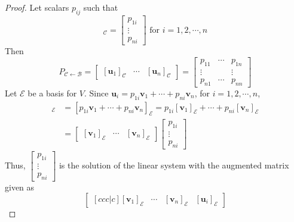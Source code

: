 \begin{proof}
	Let scalars $p_{ij}$ such that \begin{equation*}
		[\textbf{u}_i]_\mathcal{C} = \begin{bmatrix}
			p_{1i} \\ \vdots \\ p_{ni}
		\end{bmatrix} \mbox{ for } i = 1, 2, \cdots, n
	\end{equation*} Then \begin{equation*}
		P_{ \mathcal{C} \leftarrow \mathcal{B} } = \begin{bmatrix}
			\left [\textbf{u}_1\right ]_\mathcal{C} & \cdots & [\textbf{u}_n]_\mathcal{C}
		\end{bmatrix} = \begin{bmatrix}
			p_{11} & \cdots & p_{1n} \\
			\vdots & & \vdots \\
			p_{n1} & \cdots & p_{nn}
		\end{bmatrix}
	\end{equation*}
	Let $\mathcal{E}$ be a basis for $V$. Since $\textbf{u}_i = p_{1i}\textbf{v}_1 + \cdots + p_{ni}\textbf{v}_n$, for $i = 1, 2, \cdots, n$, \begin{align*}
		[\textbf{u}_i]_\mathcal{E} &= [p_{1i}\textbf{v}_1 + \cdots + p_{ni}\textbf{v}_n]_\mathcal{E} = p_{1i}[\textbf{v}_1]_\mathcal{E} + \cdots + p_{ni}[\textbf{v}_n]_\mathcal{E} \\
		&= \begin{bmatrix}
			\left[\textbf{v}_1\right]_\mathcal{E} & \cdots & \left[\textbf{v}_n\right]_\mathcal{E}
		\end{bmatrix}\begin{bmatrix}
			p_{1i} \\ \vdots \\ p_{ni}
		\end{bmatrix}
	\end{align*}
	Thus, $\begin{bmatrix}
		p_{1i} \\ \vdots \\ p_{ni}
	\end{bmatrix}$ is the solution of the linear system with the augmented matrix given as \begin{equation*}
		\begin{bmatrix}[ccc|c]
			\left[\textbf{v}_1\right]_\mathcal{E} & \cdots & \left[\textbf{v}_n\right]_\mathcal{E} & \left[\textbf{u}_i\right]_\mathcal{E}
		\end{bmatrix}

\end{equation*}
\end{proof}
